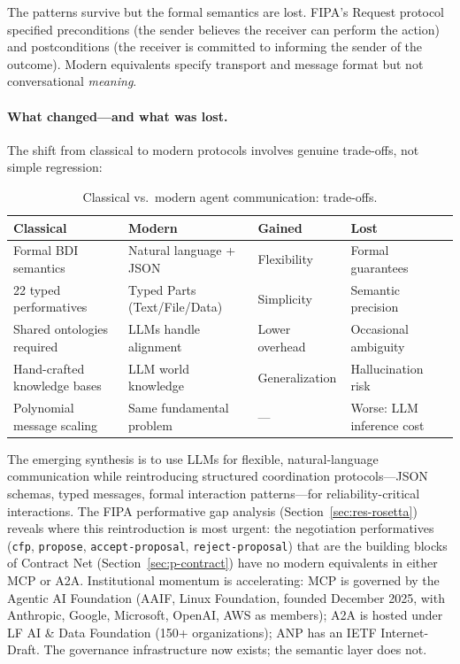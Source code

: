 \documentclass{article}
\begin{document}
The patterns survive but the formal semantics are lost. FIPA's Request protocol specified
preconditions (the sender believes the receiver can perform the action) and postconditions
(the receiver is committed to informing the sender of the outcome). Modern equivalents
specify transport and message format but not conversational \emph{meaning}.

\paragraph{What changed---and what was lost.}
The shift from classical to modern protocols involves genuine trade-offs, not simple
regression:

\begin{table}[t]
\centering
\caption{Classical vs.\ modern agent communication: trade-offs.}
\label{tab:classical-modern-tradeoffs}
\small
\begin{tabular}{@{} p{4cm} p{4cm} p{3cm} p{4cm} @{}}
\toprule
\textbf{Classical} & \textbf{Modern} & \textbf{Gained} & \textbf{Lost} \\
\midrule
Formal BDI semantics & Natural language + JSON & Flexibility & Formal guarantees \\
22 typed performatives & Typed Parts (Text/File/Data) & Simplicity & Semantic precision \\
Shared ontologies required & LLMs handle alignment & Lower overhead & Occasional ambiguity \\
Hand-crafted knowledge bases & LLM world knowledge & Generalization & Hallucination risk \\
Polynomial message scaling & Same fundamental problem & --- & Worse: LLM inference cost \\
\bottomrule
\end{tabular}
\end{table}

\noindent
The emerging synthesis is to use LLMs for flexible, natural-language communication while
reintroducing structured coordination protocols---JSON schemas, typed messages, formal
interaction patterns---for reliability-critical interactions. The FIPA performative gap
analysis (Section~\ref{sec:res-rosetta}) reveals where this reintroduction is most
urgent: the negotiation performatives (\texttt{cfp}, \texttt{propose},
\texttt{accept-proposal}, \texttt{reject-proposal}) that are the building blocks of
Contract Net (Section~\ref{sec:p-contract}) have no modern equivalents in either MCP or
A2A. Institutional momentum is accelerating: MCP is governed by the Agentic AI
Foundation (AAIF, Linux Foundation, founded December 2025, with Anthropic, Google,
Microsoft, OpenAI, AWS as members); A2A is hosted under LF AI \& Data Foundation
(150+ organizations); ANP has an IETF Internet-Draft. The governance infrastructure
now exists; the semantic layer does not.
\end{document}
